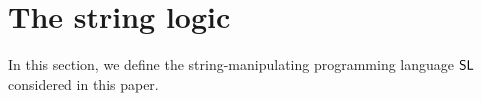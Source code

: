 
\section{The string logic}\label{sec:logic}


In this section, we define the string-manipulating programming language $\mathsf{SL}$ considered in this paper.



%
%
%
